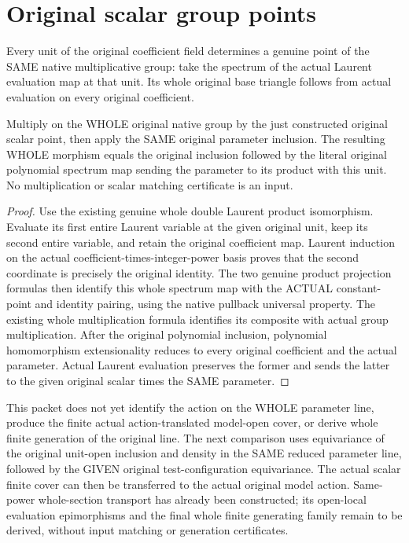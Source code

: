 \section{Original scalar group points}
\begin{definition}
\label{def:central-embedding-actual-original-scalar-group-point}
\leanok
Every unit of the original coefficient field determines a genuine point of
the SAME native multiplicative group: take the spectrum of the actual Laurent
evaluation map at that unit. Its whole original base triangle follows from
actual evaluation on every original coefficient.
\end{definition}
\begin{theorem}
\label{thm:central-embedding-actual-original-scalar-group-multiply-parameter}
\leanok
Multiply on the WHOLE original native group by the just constructed original
scalar point, then apply the SAME original parameter inclusion. The resulting
WHOLE morphism equals the original inclusion followed by the literal original
polynomial spectrum map sending the parameter to its product with this unit.
No multiplication or scalar matching certificate is an input.
\end{theorem}
\begin{proof}
Use the existing genuine whole double Laurent product isomorphism. Evaluate
its first entire Laurent variable at the given original unit, keep its second
entire variable, and retain the original coefficient map. Laurent induction
on the actual coefficient-times-integer-power basis proves that the second
coordinate is precisely the original identity. The two genuine product
projection formulas then identify this whole spectrum map with the ACTUAL
constant-point and identity pairing, using the native pullback universal
property. The existing whole multiplication formula identifies its composite
with actual group multiplication. After the original polynomial inclusion,
polynomial homomorphism extensionality reduces to every original coefficient
and the actual parameter. Actual Laurent evaluation preserves the former and
sends the latter to the given original scalar times the SAME parameter.
\end{proof}
This packet does not yet identify the action on the WHOLE parameter line,
produce the finite actual action-translated model-open cover, or derive whole
finite generation of the original line. The next comparison uses equivariance
of the original unit-open inclusion and density in the SAME reduced parameter
line, followed by the GIVEN original test-configuration equivariance. The
actual scalar finite cover can then be transferred to the actual original
model action. Same-power whole-section transport has already been constructed;
its open-local evaluation epimorphisms and the final whole finite generating
family remain to be derived, without input matching or generation certificates.
